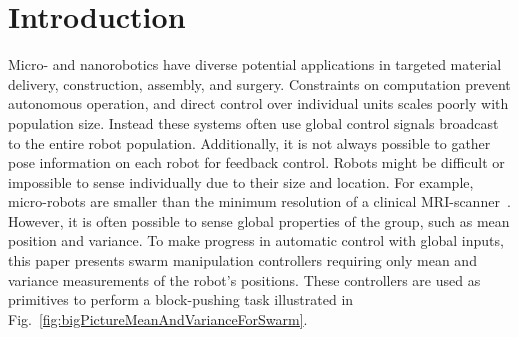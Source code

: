 \section{Introduction}\label{sec:Intro}


Micro- and nanorobotics have diverse potential applications in targeted material delivery, construction, assembly, and surgery. %
Constraints on computation prevent autonomous operation, and direct control over individual units scales poorly with population size.
Instead these systems often use global control signals broadcast to the entire robot population. 
Additionally, it is not always possible to gather pose information on each robot for feedback control. 
Robots might be difficult or impossible to sense individually due to their size and location. 
For example, micro-robots are smaller than the minimum resolution of a clinical MRI-scanner~\cite{martel2014computer}.
However, it is often possible to sense global properties of the group, such as mean position and variance. 
To make progress in automatic control with global inputs, this paper presents swarm manipulation controllers requiring only mean and variance measurements of the robot's positions.  These controllers are used as primitives to perform a block-pushing task illustrated in Fig.~\ref{fig:bigPictureMeanAndVarianceForSwarm}.


 

